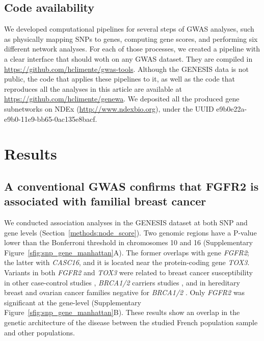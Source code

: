 \documentclass[twocolumn, 11pt]{article}
\begin{document}
\subsection{Code availability}

We developed computational pipelines for several steps of GWAS analyses, such as physically mapping SNPs to genes, computing gene scores, and performing six different network analyses. For each of those processes, we created a pipeline with a clear interface that should woth on any GWAS dataset. They are compiled in \url{https://github.com/hclimente/gwas-tools}. Although the GENESIS data is not public, the code that applies these pipelines to it, as well as the code that reproduces all the analyses in this article are available at \url{https://github.com/hclimente/genewa}. We deposited all the produced gene subnetworks on NDEx (\url{http://www.ndexbio.org}), under the UUID e9b0e22a-e9b0-11e9-bb65-0ac135e8bacf.

\section{Results}

\subsection{A conventional GWAS confirms that FGFR2 is associated with familial breast cancer}
\label{results:conventional}

We conducted association analyses in the GENESIS dataset at both SNP and gene levels (Section~\ref{methods:node_score}). Two genomic regions have a P-value lower than the Bonferroni threshold in chromosomes 10 and 16 (Supplementary Figure~\ref{sfig:snp_gene_manhattan}A). The former overlaps with gene \emph{FGFR2}; the latter with \emph{CASC16}, and it is located near the protein-coding gene \emph{TOX3}. Variants in both \emph{FGFR2} and \emph{TOX3} were related to breast cancer susceptibility in other case-control studies \cite{Michailidou2017}, \emph{BRCA1/2} carriers studies \cite{Mulligan2011}, and in hereditary breast and ovarian cancer families negative for \emph{BRCA1/2} \cite{rinella_genetic_2013}. Only \emph{FGFR2} was significant at the gene-level (Supplementary Figure~\ref{sfig:snp_gene_manhattan}B). These results show an overlap in the genetic architecture of the disease between the studied French population sample and other populations.
\end{document}
